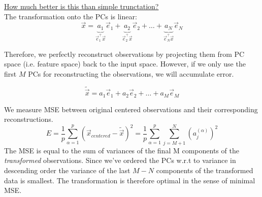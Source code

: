 \begin{frame}
\begin{enumerate}
{

}


\end{enumerate}

\end{frame}


\underline{How much better is this than simple trunctation?}\\[0.3cm]
The transformation onto the PCs is linear:
\begin{equation*}
	\vec{x} = \underbrace{ a_1 }_{ \vec{e}_1^\top \vec{x} } \vec{e}_1
		+ \underbrace{ a_2 }_{ \vec{e}_2^\top \vec{x} } \vec{e}_2
		+ \ldots
		+ \underbrace{ a_N }_{ \vec{e}_N^\top \vec{x} } \vec{e}_N
\end{equation*}

Therefore, we perfectly reconstruct observations by projecting them from PC space (i.e. feature space) back to the input space. 
However, if we only use the first $M$ PCs for reconstructing the observations, we will accumulate error.

$$
\widetilde{\vec{x}} = a_1 \vec{e}_1 + a_2 \vec{e}_2 + \ldots
		+ a_M \vec{e}_M
$$
		
We measure MSE between original centered observations and their corresponding reconstructions.
$$
E = \frac{1}{p} \sum_{\alpha = 1}^{p} (\vec x_{centered} - \widetilde{\vec{x}})^2 = \frac{1}{p} \sum_{\alpha = 1}^{p} \sum_{j = M+1}^{N} (a_j^{(\alpha)})^2
$$
The MSE is equal to the sum of variances of the final M components of the \emph{transformed} observations. Since we've ordered the PCs w.r.t to variance in descending order the variance of the last $M-N$ components of the transformed data is smallest.
The transformation is therefore optimal in the sense of minimal MSE.



